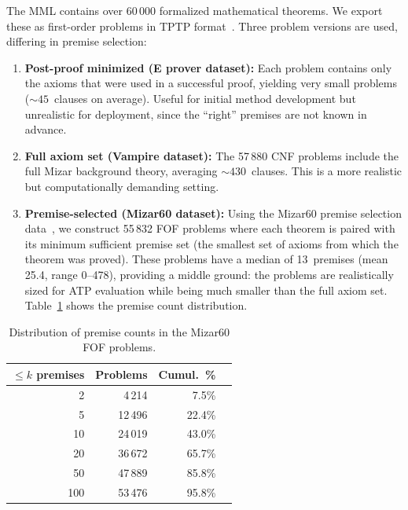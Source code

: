 \documentclass{easychair}
\newcommand{\Mizar}{Mizar\xspace}
\newcommand{\MML}{MML\xspace}
\begin{document}
The \MML contains over 60\,000 formalized mathematical theorems.  We
export these as first-order problems in TPTP
format~\cite{Sutcliffe2009}.  Three problem versions are used, differing
in premise selection:

\begin{enumerate}
\item \textbf{Post-proof minimized (E prover dataset):}
  Each problem contains only the axioms that were used in a successful
  proof, yielding very small problems (${\sim}45$~clauses on average).
  Useful for initial method development but unrealistic for deployment,
  since the ``right'' premises are not known in advance.

\item \textbf{Full axiom set (Vampire dataset):}
  The 57\,880 CNF problems include the full \Mizar background theory,
  averaging ${\sim}430$~clauses.  This is a more realistic but
  computationally demanding setting.

\item \textbf{Premise-selected (Mizar60 dataset):}
  Using the Mizar60 premise selection data~\cite{KaliszykU2015}, we
  construct 55\,832 FOF problems where each theorem is paired with
  its minimum sufficient premise set (the smallest set of axioms from
  which the theorem was proved).  These problems have a median of
  13~premises (mean 25.4, range 0--478), providing a middle ground:
  the problems are realistically sized for ATP evaluation while
  being much smaller than the full axiom set.
  Table~\ref{tab:premise-dist} shows the premise count distribution.
\end{enumerate}

\begin{table}[t]
\centering
\caption{Distribution of premise counts in the Mizar60 FOF problems.}
\label{tab:premise-dist}
\small
\begin{tabular}{rrrr}
\toprule
$\leq k$ premises & Problems & Cumul.\ \% \\
\midrule
2   &  4\,214 &  7.5\% \\
5   & 12\,496 & 22.4\% \\
10  & 24\,019 & 43.0\% \\
20  & 36\,672 & 65.7\% \\
50  & 47\,889 & 85.8\% \\
100 & 53\,476 & 95.8\% \\
\bottomrule
\end{tabular}
\end{table}
\end{document}
